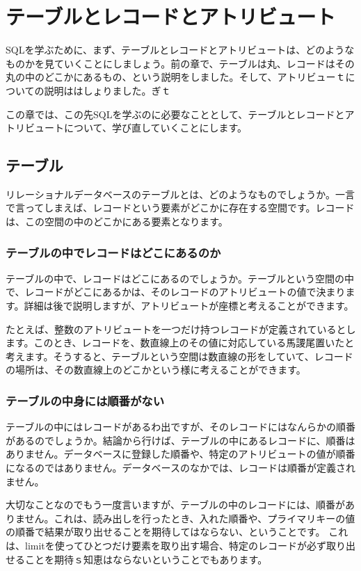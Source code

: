 \chapter{テーブルとレコードとアトリビュート}

SQLを学ぶために、まず、テーブルとレコードとアトリビュートは、どのようなものかを見ていくことにしましょう。前の章で、テーブルは丸、レコードはその丸の中のどこかにあるもの、という説明をしました。そして、アトリビューｔについての説明ははしょりました。ぎｔ

この章では、この先SQLを学ぶのに必要なこととして、テーブルとレコードとアトリビュートについて、学び直していくことにします。


\section{テーブル}

リレーショナルデータベースのテーブルとは、どのようなものでしょうか。一言で言ってしまえば、レコードという要素がどこかに存在する空間です。レコードは、この空間の中のどこかにある要素となります。

\subsection{テーブルの中でレコードはどこにあるのか}

テーブルの中で、レコードはどこにあるのでしょうか。テーブルという空間の中で、レコードがどこにあるかは、そのレコードのアトリビュートの値で決まります。詳細は後で説明しますが、アトリビュートが座標と考えることができます。

たとえば、整数のアトリビュートを一つだけ持つレコードが定義されているとします。このとき、レコードを、数直線上のその値に対応している馬謖尾置いたと考えます。そうすると、テーブルという空間は数直線の形をしていて、レコードの場所は、その数直線上のどこかという様に考えることができます。


\subsection{テーブルの中身には順番がない}


テーブルの中にはレコードがあるわ出ですが、そのレコードにはなんらかの順番があるのでしょうか。結論から行けば、テーブルの中にあるレコードに、順番はありません。データベースに登録した順番や、特定のアトリビュートの値が順番になるのではありません。データベースのなかでは、レコードは順番が定義されません。

大切なことなのでもう一度言いますが、テーブルの中のレコードには、順番がありません。これは、読み出しを行ったとき、入れた順番や、プライマリキーの値の順番で結果が取り出せることを期待してはならない、ということです。
これは、limitを使ってひとつだけ要素を取り出す場合、特定のレコードが必ず取り出せることを期待ｓ知恵はならないということでもあります。


